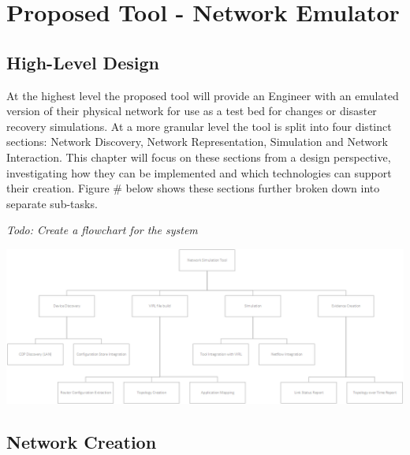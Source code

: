 \documentclass[11pt]{report}
\begin{document}
\chapter{Proposed Tool - Network Emulator}

\section{High-Level Design}

At the highest level the proposed tool will provide an Engineer with an emulated version of their physical network for use as a test bed for changes or disaster recovery simulations. At a more granular level the tool is split into four distinct sections: Network Discovery, Network Representation, Simulation and Network Interaction. This chapter will focus on these sections from a design perspective, investigating how they can be implemented and which technologies can support their creation. Figure \# below shows these sections further broken down into separate sub-tasks.

\textit{Todo: Create a flowchart for the system}

\begin{center}
\includegraphics[width=1\textwidth]{Work-Breakdown.png}
\end{center}

\section{Network Creation}
\end{document}
